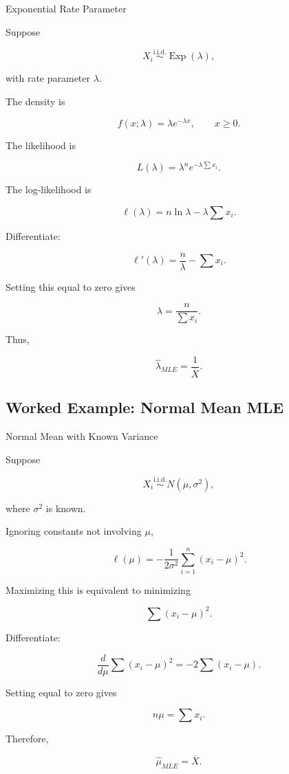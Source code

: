 \begin{workedexamplebox}{Exponential Rate Parameter}

Suppose

\[
X_i
\overset{\text{i.i.d.}}{\sim}
\operatorname{Exp}(\lambda),
\]

with rate parameter \(\lambda\).

The density is

\[
f(x;\lambda)
=
\lambda e^{-\lambda x},
\qquad
x\geq0.
\]

The likelihood is

\[
L(\lambda)
=
\lambda^n
e^{-\lambda\sum x_i}.
\]

The log-likelihood is

\[
\ell(\lambda)
=
n\ln\lambda
-
\lambda
\sum x_i.
\]

Differentiate:

\[
\ell'(\lambda)
=
\frac n\lambda
-
\sum x_i.
\]

Setting this equal to zero gives

\[
\lambda
=
\frac{
n
}{
\sum x_i
}.
\]

Thus,

\begin{answerbox}
\[
\boxed{
\widehat{\lambda}_{MLE}
=
\frac1{\overline{X}}.
}
\]
\end{answerbox}

\end{workedexamplebox}

\subsection{Worked Example: Normal Mean MLE}
\label{subsec:worked-normal-mean-mle}

\begin{workedexamplebox}{Normal Mean with Known Variance}

Suppose

\[
X_i
\overset{\text{i.i.d.}}{\sim}
N(\mu,\sigma^2),
\]

where \(\sigma^2\) is known.

Ignoring constants not involving \(\mu\),

\[
\ell(\mu)
=
-
\frac1{2\sigma^2}
\sum_{i=1}^{n}
(x_i-\mu)^2.
\]

Maximizing this is equivalent to minimizing

\[
\sum
(x_i-\mu)^2.
\]

Differentiate:

\[
\frac{d}{d\mu}
\sum
(x_i-\mu)^2
=
-2\sum(x_i-\mu).
\]

Setting equal to zero gives

\[
n\mu
=
\sum x_i.
\]

Therefore,

\begin{answerbox}
\[
\boxed{
\widehat{\mu}_{MLE}
=
\overline{X}.
}
\]
\end{answerbox}

\end{workedexamplebox}

